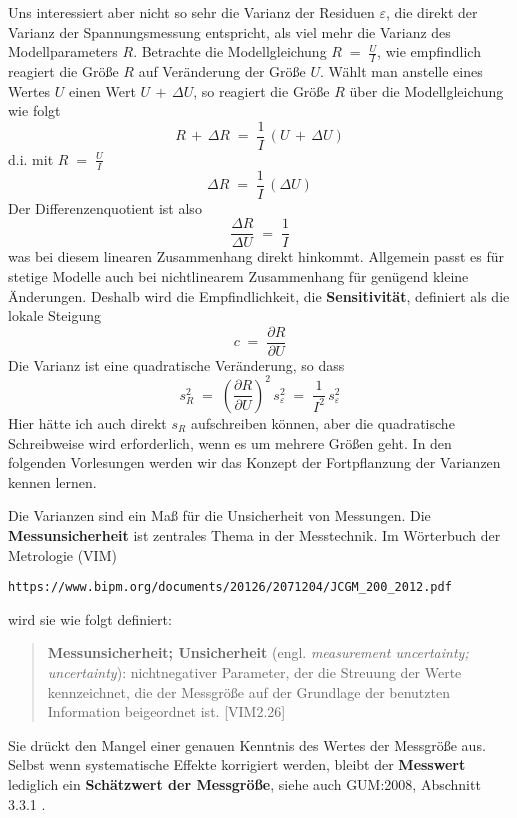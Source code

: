 Uns interessiert aber nicht so sehr die Varianz der Residuen $\varepsilon$, die direkt der Varianz
der Spannungsmessung entspricht,
als viel mehr die Varianz des Modellparameters $R$.
Betrachte die Modellgleichung $R \; = \; \frac{U}{I}$, wie empfindlich reagiert die Größe $R$ auf Veränderung der Größe $U$.
Wählt man anstelle eines Wertes $U$ einen Wert $U \, + \, \Delta U$, so reagiert die Größe $R$ über die Modellgleichung wie folgt
\begin{equation}
R \, + \, \Delta R \; = \; \frac{1}{I} \, \left( U \, + \, \Delta U \right)
\end{equation}
d.i. mit $R \; = \; \frac{U}{I}$
\begin{equation}
\Delta R \; = \; \frac{1}{I} \, \left( \Delta U \right)
\end{equation}
Der Differenzenquotient ist also
\begin{equation}
\frac{\Delta R}{\Delta U} \; = \; \frac{1}{I}
\end{equation}
was bei diesem linearen Zusammenhang direkt hinkommt. Allgemein passt es für stetige Modelle auch bei nichtlinearem Zusammenhang
für genügend kleine Änderungen. Deshalb wird die Empfindlichkeit, die \textbf{Sensitivität}, definiert als die lokale Steigung
\begin{equation}
c  \; = \; \frac{\partial R}{\partial U}
\end{equation}
Die Varianz ist eine quadratische Veränderung, so dass
\begin{equation}
s_R^2  \; = \; \left(\frac{\partial R}{\partial U}\right)^2 \, s_{\varepsilon}^2 \; = \; \frac{1}{I^2} \, s_{\varepsilon}^2
\end{equation}
Hier hätte ich auch direkt $s_R$ aufschreiben können, aber die quadratische Schreibweise wird erforderlich, wenn es um mehrere Größen geht. In den folgenden Vorlesungen werden wir das Konzept der Fortpflanzung der Varianzen kennen lernen.

Die Varianzen sind ein Maß für die Unsicherheit von Messungen. Die \textbf{Messunsicherheit} ist zentrales Thema in der Messtechnik.
Im Wörterbuch der Metrologie (VIM)
\begin{verbatim}
https://www.bipm.org/documents/20126/2071204/JCGM_200_2012.pdf
\end{verbatim}
wird sie wie folgt definiert:
\begin{quote}
\textbf{Messunsicherheit; Unsicherheit} (engl. \textsl{measurement uncertainty; uncertainty}):
nichtnegativer Parameter, der die Streuung der Werte kennzeichnet, die der Messgröße
auf der Grundlage der benutzten Information beigeordnet ist. [VIM2.26]
\end{quote}
Sie drückt den Mangel einer genauen Kenntnis des Wertes der Messgröße aus.
Selbst wenn systematische Effekte korrigiert werden, bleibt der \textbf{Messwert} lediglich
ein \textbf{Schätz\-wert der Messgröße}, siehe auch GUM:2008, Abschnitt 3.3.1 .

